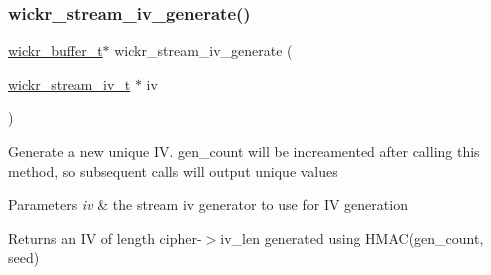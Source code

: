 \subsubsection{\texorpdfstring{wickr\+\_\+stream\+\_\+iv\+\_\+generate()}{wickr\_stream\_iv\_generate()}}
{\footnotesize\ttfamily \mbox{\hyperlink{structwickr__buffer}{wickr\+\_\+buffer\+\_\+t}}$\ast$ wickr\+\_\+stream\+\_\+iv\+\_\+generate (\begin{DoxyParamCaption}\item[{\mbox{\hyperlink{structwickr__stream__iv}{wickr\+\_\+stream\+\_\+iv\+\_\+t}} $\ast$}]{iv }\end{DoxyParamCaption})}

Generate a new unique IV. gen\+\_\+count will be increamented after calling this method, so subsequent calls will output unique values


\begin{DoxyParams}{Parameters}
{\em iv} & the stream iv generator to use for IV generation \\
\hline
\end{DoxyParams}
\begin{DoxyReturn}{Returns}
an IV of length \textquotesingle{}cipher\textquotesingle{}-\/$>$iv\+\_\+len generated using H\+M\+A\+C(gen\+\_\+count, seed) 
\end{DoxyReturn}
